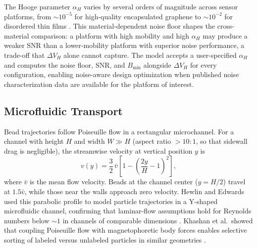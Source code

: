 \documentclass[biosensors,article,submit,pdftex,moreauthors]{Definitions/mdpi}
\begin{document}
The Hooge parameter $\alpha_H$ varies by several orders of magnitude across sensor
platforms, from ${\sim}10^{-5}$ for high-quality encapsulated graphene to
${\sim}10^{-2}$ for disordered thin films \cite{xu2013,huang2014}. This
material-dependent noise floor shapes the cross-material comparison: a platform with
high mobility and high $\alpha_H$ may produce a weaker SNR than a lower-mobility
platform with superior noise performance, a trade-off that $\Delta V_H$ alone cannot
capture. The model accepts a user-specified $\alpha_H$ and computes the noise floor,
SNR, and $B_\text{min}$ alongside $\Delta V_H$ for every configuration, enabling
noise-aware design optimization when published noise characterization data are
available for the platform of interest.

\subsection{Microfluidic Transport}
\label{sec:transport}

Bead trajectories follow Poiseuille flow in a rectangular microchannel. For a
channel with height $H$ and width $W \gg H$ (aspect ratio ${>}10{:}1$, so that
sidewall drag is negligible), the streamwise velocity at vertical position $y$ is
\begin{equation}
v(y) = \frac{3}{2}\,\bar{v}\left[1 - \left(\frac{2y}{H} - 1\right)^2\right],
\label{eq:poiseuille}
\end{equation}
where $\bar{v}$ is the mean flow velocity. Beads at the channel center ($y = H/2$)
travel at $1.5\bar{v}$, while those near the walls approach zero velocity. Hewlin
and Edwards used this parabolic profile to model particle trajectories in a Y-shaped
microfluidic channel, confirming that laminar-flow assumptions hold for Reynolds
numbers below ${\sim}1$ in channels of comparable dimensions \cite{hewlin2023}.
Khashan et al.\ showed that coupling Poiseuille flow with magnetophoretic body
forces enables selective sorting of labeled versus unlabeled particles in similar
geometries \cite{khashan2024}.
\end{document}
